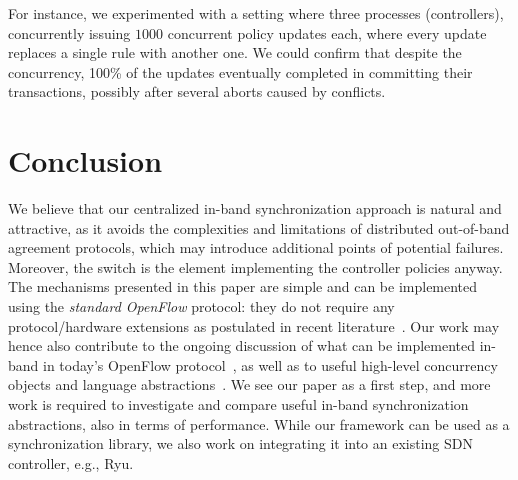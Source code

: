 \documentclass{sig-alternate-2006}
\newcommand{\petr}[1]{\textit{\textcolor{blue}{[petr]: #1}}} %
\begin{document}
For instance, we experimented with a setting where three processes
(controllers), concurrently issuing $1000$ concurrent policy updates
each, where every update replaces a single rule with another one.
We could confirm that 
despite the concurrency, 100\% of the updates 
eventually completed in committing their transactions, possibly after
several aborts caused by conflicts. 


\section{Conclusion}\label{sec:conclusion}


We believe that our centralized in-band
synchronization approach is natural and attractive, as it avoids the
complexities and limitations of distributed out-of-band agreement protocols, which may 
introduce additional points of potential failures.
Moreover, the switch is the element implementing the controller policies anyway.
The mechanisms presented in this paper are simple and can be implemented using the \emph{standard OpenFlow}
protocol: they do not require any protocol/hardware extensions as postulated in recent literature~\cite{stn,netpaxos}.
Our work may hence also contribute to the ongoing discussion of what can be implemented
in-band in today's OpenFlow protocol~\cite{reclaim},
as well as to useful high-level concurrency objects and
language abstractions~\cite{pyretic}.
We see our paper as a first step, and more
work is required to investigate and compare useful
in-band synchronization abstractions, also in terms of performance.
While our framework can be used as a synchronization library, we 
also work on integrating it into an existing SDN controller, e.g., Ryu. 


{

}
\end{document}
